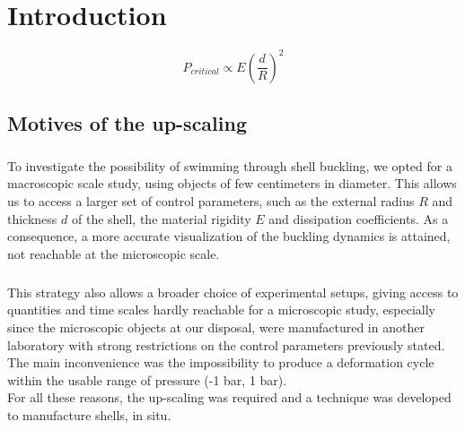 \chapter{Introduction}
\label{introduction}

$$P_{critical} \propto E (\frac{d}{R})^2$$
\section{Motives of the up-scaling}
\paragraph{}
To investigate the possibility of swimming through shell buckling, we opted for a macroscopic scale study, using objects of few centimeters in diameter. This allows us to access a larger set of control parameters, such as the external radius $R$ and thickness $d$ of the shell, the material rigidity $E$ and dissipation coefficients. As a consequence, a more accurate visualization of the buckling dynamics is attained, not reachable at the microscopic scale.
\paragraph{}This strategy also allows a broader choice of experimental setups, giving access to quantities and time scales hardly reachable for a microscopic study, especially since the microscopic objects at our disposal, were manufactured in another laboratory with strong restrictions on the control parameters previously stated. The main inconvenience was the impossibility to produce a deformation cycle within the usable range of pressure (-1 bar, 1 bar).\\
For all these reasons, the up-scaling was required and a technique was developed to manufacture shells, in situ.
